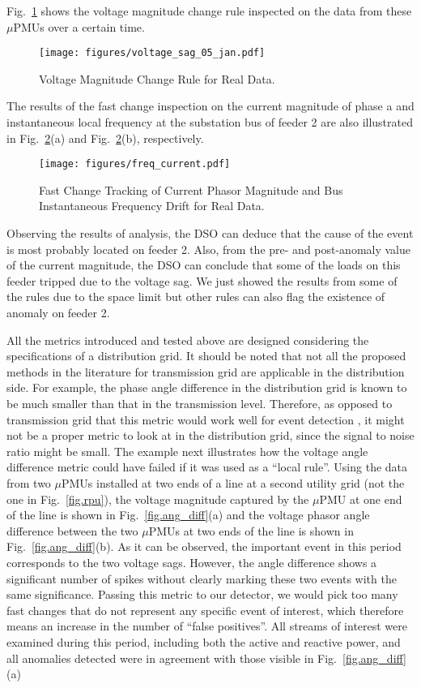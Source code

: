 \documentclass[twocolumn]{IEEEtran}
\newcommand{\mup}{\mu \text{PMU}}
\begin{document}
Fig.~\ref{fig.voltage_sag_05_jan} shows the voltage magnitude change rule inspected on the data from these $\mup$s over a certain time.  
\begin{figure}[ht]
\centering 
\texttt{[image: figures/voltage\_sag\_05\_jan.pdf]}
\caption{Voltage Magnitude Change Rule for Real Data.}
\label{fig.voltage_sag_05_jan}
\end{figure}
The results of the fast change inspection on the current magnitude of phase a and instantaneous local frequency at the substation bus of feeder 2 are also illustrated in Fig.~\ref{fig.freq_current_05_jan}(a) and Fig.~\ref{fig.freq_current_05_jan}(b), respectively. 
\begin{figure}[ht] 
\centering
    \texttt{[image: figures/freq\_current.pdf]}
    \caption{Fast Change Tracking of Current Phasor Magnitude and Bus Instantaneous Frequency Drift for Real Data.}
    \label{fig.freq_current_05_jan}
\end{figure} 
Observing the results of analysis, the DSO can deduce that the cause of the event is most probably located on feeder 2. Also, from the pre- and post-anomaly value of the current magnitude, the DSO can conclude that some of the loads on this feeder tripped due to the voltage sag. 
We just showed the results from some of the rules due to the space limit but other rules can also flag the existence of anomaly on feeder 2.

All the metrics introduced and tested above are designed considering the specifications of a distribution grid. It should be noted that not all the proposed methods in the literature for transmission grid are applicable in the distribution side. For example, the phase angle difference in the distribution grid is known to be much smaller than that in the transmission level. Therefore, as opposed to transmission grid that this metric would work well for event detection \cite{allen2014pmu}, it might not be a proper metric to look at in the distribution grid, since the signal to noise ratio might be small. The example next illustrates how the voltage angle difference metric could have failed if it was used as a ``local rule''. 
Using the data from two $\mup$s installed at two ends of a line at a second utility grid (not the one in Fig.~\ref{fig.rpu}), the voltage magnitude captured by the $\mup$ at one end of the line is shown in Fig.~\ref{fig.ang_diff}(a) and the voltage phasor angle difference between the two $\mup$s at two ends of the line is shown in Fig.~\ref{fig.ang_diff}(b). As it can be observed, the important event in this period corresponds to the two voltage sags. However, the angle difference shows a significant number of spikes without clearly marking these two events with the same significance. Passing this metric to our detector, we would pick too many fast changes that do not represent any specific event of interest, which therefore means an increase in the number of ``false positives''. All streams of interest were examined during this period, including both the active and reactive power, and all anomalies detected were in agreement with those visible in Fig.~\ref{fig.ang_diff}(a)
\end{document}
